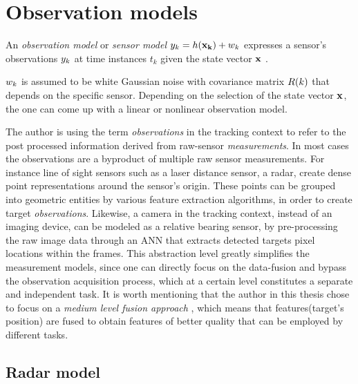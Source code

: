 
\section{Observation models} \label{sec:ObservationModels}

An \emph{observation model} or \emph{sensor model} ${{y}}_k = h(\mathbf{x_k}) + {w}_k$ expresses a sensor's observations ${{y}}_k$ at time instances $t_k$ given the state vector $\mathbf{x}$ .

 ${w}_k$ is assumed to be white Gaussian noise with covariance matrix ${R}(k)$ that depends on the specific sensor. Depending on the selection of the state vector $\mathbf{x}$, the one can come up with a linear or nonlinear observation model.

The author is using the term \emph{observations} in the tracking context to refer to the post processed information derived from raw-sensor \emph{measurements}. In most cases the observations are a byproduct of multiple raw sensor measurements. For instance line of sight sensors such as a laser distance sensor, a radar, create dense point representations around the sensor's origin. These points can be grouped into geometric entities by various feature extraction algorithms, in order to create target \emph{observations}.  Likewise, a camera in the tracking context, instead of an imaging device, can be modeled as a relative bearing sensor, by pre-processing the raw image data through an ANN that extracts detected targets pixel locations within the frames. This abstraction level greatly simplifies the measurement models, since one can directly focus on the data-fusion and bypass the observation acquisition process, which at a certain level constitutes a separate and independent task. It is worth mentioning that the author in this thesis chose to focus on a \emph{medium level fusion approach} \cite{Luo2002}, which means that features(target's position) are fused to obtain features of better quality that can be employed by different tasks.





\subsection{Radar model}

